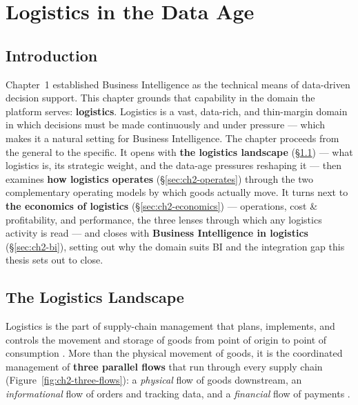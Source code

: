 \chapter{Logistics in the Data Age}

\section*{Introduction}

Chapter~1 established Business Intelligence as the technical means of data-driven decision support.
This chapter grounds that capability in the domain the platform serves: \textbf{logistics}. Logistics
is a vast, data-rich, and thin-margin domain in which decisions must be made continuously and under
pressure --- which makes it a natural setting for Business Intelligence. The chapter proceeds from the
general to the specific. It opens with \textbf{the logistics landscape} (\S\ref{sec:ch2-landscape}) ---
what logistics is, its strategic weight, and the data-age pressures reshaping it --- then examines
\textbf{how logistics operates} (\S\ref{sec:ch2-operates}) through the two complementary operating
models by which goods actually move. It turns next to \textbf{the economics of logistics}
(\S\ref{sec:ch2-economics}) --- operations, cost \& profitability, and performance, the three lenses
through which any logistics activity is read --- and closes with \textbf{Business Intelligence in logistics}
(\S\ref{sec:ch2-bi}), setting out why the domain suits BI and the integration gap this thesis sets out
to close.

\section{The Logistics Landscape}
\label{sec:ch2-landscape}

Logistics is the part of supply-chain management that plans, implements, and controls the movement and
storage of goods from point of origin to point of consumption \parencite{christopher2016}. More than
the physical movement of goods, it is the coordinated management of \textbf{three parallel flows} that
run through every supply chain (Figure~\ref{fig:ch2-three-flows}): a \emph{physical} flow of goods
downstream, an \emph{informational} flow of orders and tracking data, and a \emph{financial} flow of
payments \parencite{chopra2019}.

